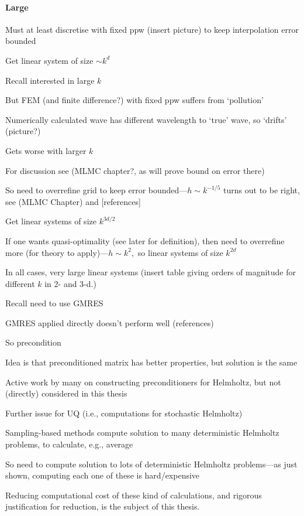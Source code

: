 \paragraph{Large}
\bit
\item Must at least discretise with fixed ppw (insert picture) to keep interpolation error bounded
\item Get linear system of size $\sim k^d$
\item Recall interested in large $k$
\item But FEM (and finite difference?) with fixed ppw suffers from `pollution'
\bit
\item Numerically calculated wave has different wavelength to `true' wave, so `drifts' (picture?)
\item Gets worse with larger $k$
\item For discussion see (MLMC chapter?, as will prove bound on error there)
\eit
\item So need to overrefine grid to keep error bounded---$h \sim k^{-1/5}$ turns out to be right, see (MLMC Chapter) and [references]
\item Get linear systems of size $k^{3d/2}$
\item If one wants quasi-optimality (see later for definition), then need to overrefine more (for theory to apply)---$h \sim k^2,$ so linear systems of size $k^{2d}$
\eit
\bit
\item In all cases, very large linear systems (insert table giving orders of magnitude for different $k$ in 2- and 3-d.)
\eit
\bit
\item Recall need to use GMRES
\item GMRES applied directly doesn't perform well (references)
\item So precondition
\item Idea is that preconditioned matrix has better properties, but solution is the same
\item Active work by many on constructing preconditioners for Helmholtz, but not (directly) considered in this thesis
\eit
\bit
\item Further issue for UQ (i.e., computations for stochastic Helmholtz)
\item Sampling-based methods compute solution to many deterministic Helmholtz problems, to calculate, e.g., average
\item So need to compute solution to lots of deterministic Helmholtz problems---as just shown, computing each one of these is hard/expensive
\item Reducing computational cost of these kind of calculations, and rigorous justification for reduction, is the subject of this thesis.
\eit
